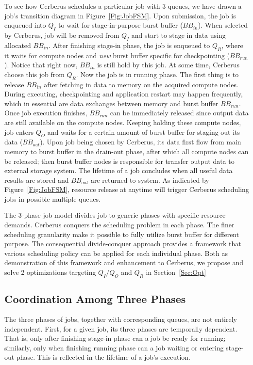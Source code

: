 To see how Cerberus schedules a particular job with 3 queues,
we have drawn a job's transition diagram in Figure~\ref{Fig:JobFSM}.
Upon submission, the job is enqueued into $Q_I$ to wait for stage-in-purpose burst buffer ($BB_{in}$).
When selected by Cerberus, job will be removed from $Q_I$ and
start to stage in data using allocated $BB_{in}$.
After finishing stage-in phase, the job is enqueued to $Q_R$, where it waits for
compute nodes and \textit{new} burst buffer specific for checkpointing ($BB_{run}$).
Notice that right now, $BB_{in}$ is still hold by this job.
At some time, Cerberus choose this job from $Q_R$.
Now the job is in running phase.
The first thing is to release $BB_{in}$ after fetching in data to memory on the acquired compute nodes.
During executing, checkpointing and application restart may happen frequently, which in essential
are data exchanges between memory and burst buffer $BB_{run}$.
Once job execution finishes, $BB_{run}$ can be immediately released since
output data are still available on the compute nodes.
Keeping holding these compute nodes, job enters $Q_O$ and waits for a certain amount of burst
buffer for staging out its data ($BB_{out}$).
Upon job being chosen by Cerberus, its data first flow from main memory to burst buffer
in the drain-out phase, after which all compute nodes can be released;
then burst buffer nodes is responsible for transfer output data to external storage system.
The lifetime of a job concludes when all useful data results are stored
and $BB_{out}$ are returned to system.
As indicated by Figure~\ref{Fig:JobFSM}, resource release at anytime will trigger Cerberus
scheduling jobs in possible multiple queues.

The 3-phase job model divides job to generic phases with specific resource demands.
Cerberus conquers the scheduling problem in each phase.
The finer scheduling granularity make it possible to fully utilize burst buffer for different purpose.
The consequential divide-conquer approach provides a framework that various scheduling
policy can be applied for each individual phase.
Both as demonstration of this framework and enhancement to Cerberus,
we propose and solve 2 optimizations targeting $Q_I/Q_O$ and $Q_R$ in Section~\ref{Sec:Opt}

\subsection{Coordination Among Three Phases}
The three phases of jobs, together with corresponding queues, are not entirely independent.
First, for a given job, its three phases are temporally dependent.
That is, only after finishing stage-in phase can a job be ready for running;
similarly, only when finishing running phase can a job waiting or entering stage-out phase.
This is reflected in the lifetime of a job's execution.

